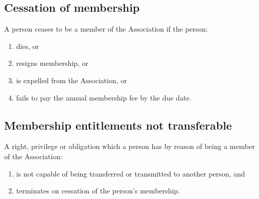 \documentclass{article}
\begin{document}
\subsection{Cessation of membership}
A person ceases to be a member of the Association if the person:
\begin{enumerate}
    \item dies, or
    \item resigns membership, or
    \item is expelled from the Association, or
    \item fails to pay the annual membership fee by the due date.
\end{enumerate}
\subsection{Membership entitlements not transferable}
A right, privilege or obligation which a person has by reason of being a member of the Association:
\begin{enumerate}
    \item is not capable of being transferred or transmitted to another person, and
    \item terminates on cessation of the person’s membership.
\end{enumerate}
\end{document}
